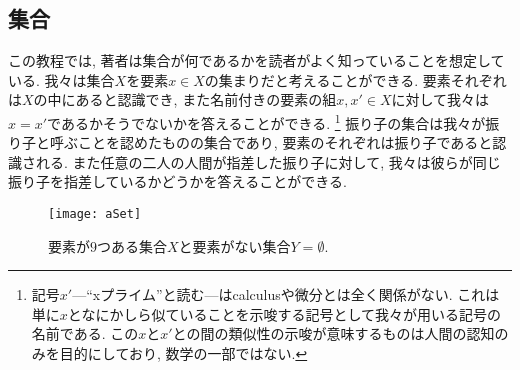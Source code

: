 

\subsection{集合}


この教程では, 著者は集合が何であるかを読者がよく知っていることを想定している. 我々は集合$X$を要素$x \in X$の集まりだと考えることができる. 要素それぞれは$X$の中にあると認識でき, また名前付きの要素の組$x,x'\in X$に対して我々は$x=x'$であるかそうでないかを答えることができる.
\footnote{記号$x'$---``xプライム''と読む---はcalculusや微分とは全く関係がない. これは単に$x$となにかしら似ていることを示唆する記号として我々が用いる記号の名前である. この$x$と$x'$との間の類似性の示唆が意味するものは人間の認知のみを目的にしており, 数学の一部ではない.}
振り子の集合は我々が振り子と呼ぶことを認めたものの集合であり, 要素のそれぞれは振り子であると認識される. また任意の二人の人間が指差した振り子に対して, 我々は彼らが同じ振り子を指差しているかどうかを答えることができる.

\begin{figure}
\begin{center}
\texttt{[image: aSet]}
\end{center}
\caption{要素が$9$つある集合$X$と要素がない集合$Y=\emptyset$.}
\end{figure}


